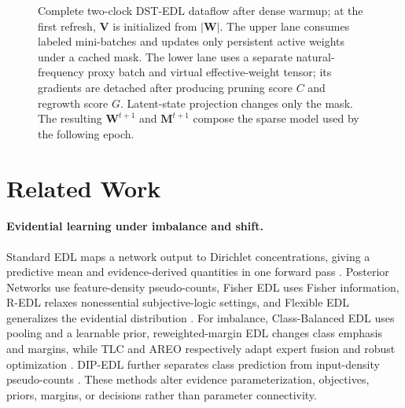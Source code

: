 \documentclass[letterpaper]{article}
\begin{document}
\begin{figure}[t]
{}
\caption{Complete two-clock DST-EDL dataflow after dense warmup; at the first refresh, $\bm V$ is initialized from $|\bm W|$. The upper lane consumes labeled mini-batches and updates only persistent active weights under a cached mask. The lower lane uses a separate natural-frequency proxy batch and virtual effective-weight tensor; its gradients are detached after producing pruning score $C$ and regrowth score $G$. Latent-state projection changes only the mask. The resulting $\bm W^{t+1}$ and $\bm M^{t+1}$ compose the sparse model used by the following epoch.}
\label{fig:workflow}
\end{figure}
\fi

\section{Related Work}\label{sec:related}

\paragraph{Evidential learning under imbalance and shift.} Standard EDL maps a network output to Dirichlet concentrations, giving a predictive mean and evidence-derived quantities in one forward pass \cite{sensoy2018evidential}. Posterior Networks use feature-density pseudo-counts, Fisher EDL uses Fisher information, R-EDL relaxes nonessential subjective-logic settings, and Flexible EDL generalizes the evidential distribution \cite{charpentier2020posterior,deng2023fisher,chen2023redl,yoon2025flexible}. For imbalance, Class-Balanced EDL uses pooling and a learnable prior, reweighted-margin EDL changes class emphasis and margins, while TLC and AREO respectively adapt expert fusion and robust optimization \cite{xia2024classbalanced,zhu2025reweighted,li2022tlc,sapkota2023areo}. DIP-EDL further separates class prediction from input-density pseudo-counts \cite{carlotti2026density}. These methods alter evidence parameterization, objectives, priors, margins, or decisions rather than parameter connectivity.
\end{document}
